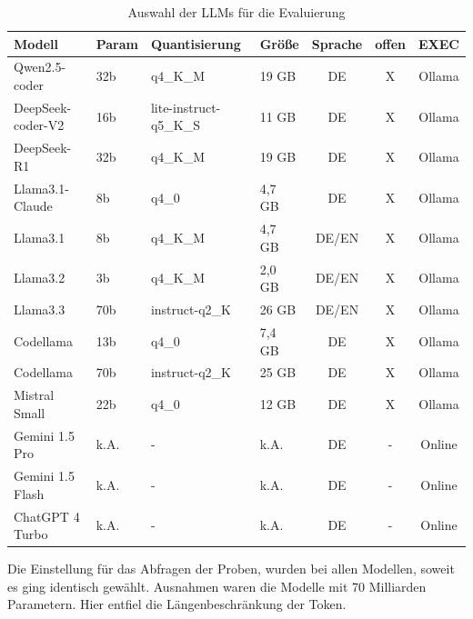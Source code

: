 \begin{table}[!ht]
	\begin{tabular}{|l|l|l|l|c|c|c|}
		\hline
		\textbf{Modell} & \textbf{Param} & \textbf{Quantisierung} & \textbf{Größe} & \textbf{Sprache} & \textbf{offen} & \textbf{EXEC} \\
		\hline
		Qwen2.5-coder     &  32b &               q4\_K\_M &  19 GB &    DE & X & Ollama \\
		DeepSeek-coder-V2 &  16b & lite-instruct-q5\_K\_S &  11 GB &    DE & X & Ollama \\
		DeepSeek-R1       &  32b &               q4\_K\_M &  19 GB &    DE & X & Ollama \\
		Llama3.1-Claude   &   8b &                  q4\_0 & 4,7 GB &    DE & X & Ollama \\
		Llama3.1          &   8b &               q4\_K\_M & 4,7 GB & DE/EN & X & Ollama \\
		Llama3.2          &   3b &               q4\_K\_M & 2,0 GB & DE/EN & X & Ollama \\
		Llama3.3          &  70b &         instruct-q2\_K &  26 GB & DE/EN & X & Ollama \\
		Codellama         &  13b &                  q4\_0 & 7,4 GB &    DE & X & Ollama \\
		Codellama         &  70b &         instruct-q2\_K &  25 GB &    DE & X & Ollama \\
		Mistral Small     &  22b &                  q4\_0 &  12 GB &    DE & X & Ollama \\
		Gemini 1.5 Pro    & k.A. &                      - &   k.A. &    DE & - & Online \\
		Gemini 1.5 Flash  & k.A. &                      - &   k.A. &    DE & - & Online \\
		ChatGPT 4 Turbo   & k.A. &                      - &   k.A. &    DE & - & Online \\
		\hline
		\hline
	\end{tabular}
	\caption{Auswahl der LLMs für die Evaluierung}
	\label{tab:selected_llms}
\end{table}

Die Einstellung für das Abfragen der Proben, wurden bei allen Modellen, soweit es ging identisch gewählt. Ausnahmen waren die Modelle mit 70 Milliarden Parametern. Hier entfiel die Längenbeschränkung der Token.\vspace{0.2cm}

